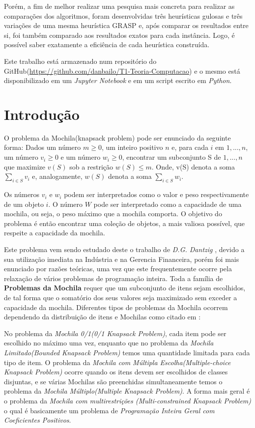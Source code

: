 \documentclass[a4paper, 12pt]{article}
\begin{document}
Porém, a fim de melhor realizar uma pesquisa mais concreta para realizar as comparações dos algoritmos,
foram desenvolvidas três heurísticas gulosas e três variações de uma mesma heurística GRASP e, após comparar
os resultados entre si, foi também comparado aos resultados exatos para cada instância. Logo, é possível saber
exatamente a eficiência de cada heurística construída.

Este trabalho está armazenado num repositório do GitHub(\url{https://github.com/danbailo/T1-Teoria-Computacao}) e
o mesmo está disponibilizado em um \textit{Jupyter Notebook} e em um script escrito em \textit{Python}.
\clearpage

\section{Introdução}

O problema da Mochila(knapsack problem) pode ser enunciado da seguinte forma:
Dados um número $m \geq 0$, um inteiro positivo $n$ e, para cada $i$ em ${1, . . . , n}$, um
número $v_i \geq 0$ e um número $w_i \geq 0$, encontrar um subconjunto S de ${1, . . . , n}$ que
maximize $v(S)$ sob a restrição $w(S)\leq m$. Onde, v(S) denota a soma $\sum_{ i \in S} v_i$ e, 
analogamente, $w(S)$ denota a soma $\sum_{ i \in S} w_i$.

Os números $v_i$ e $w_i$ podem ser interpretados como o valor e peso respectivamente
de um objeto $i$. O número $W$ pode ser interpretado como a capacidade de uma
mochila, ou seja, o peso máximo que a mochila comporta. O objetivo do problema
é então encontrar uma coleção de objetos, a mais valiosa possível, que respeite a
capacidade da mochila.

Este problema vem sendo estudado deste o trabalho de \textit{D.G. Dantzig} \cite{pisinger1995algorithms}, devido a
sua utilização imediata na Indústria e na Gerencia Financeira, porém foi mais enunciado por razões teóricas, 
uma vez que este frequentemente ocorre pela relaxação de vários problemas de programação inteira. 
Toda a família de \textbf{Problemas da Mochila} requer que um subconjunto de itens sejam escolhidos, de tal forma que o
somatório dos seus valores seja maximizado sem exceder a capacidade da mochila.
Diferentes tipos de problemas da Mochila ocorrem dependendo da distribuição de
itens e Mochilas como citado em \cite{pisinger1995algorithms}:

No problema da \textit{Mochila 0/1(0/1 Knapsack Problem)}, cada item pode ser escolhido no máximo uma vez, 
enquanto que no problema da \textit{Mochila Limitado(Bounded Knapsack Problem)} temos uma quantidade limitada 
para cada tipo de item. O problema da \textit{Mochila com Múltipla Escolha(Multiple-choice Knapsack Problem)}
ocorre quando os itens devem ser escolhidos de classes disjuntas, e se várias Mochilas são preenchidas 
simultaneamente temos o problema da \textit{Mochila Múltiplo(Multiple Knapsack Problem)}. 
A forma mais geral é o problema da \textit{Mochila com multirestrições (Multi-constrained Knapsack Problem)} 
o qual é basicamente um problema de \textit{Programação Inteira Geral com Coeficientes Positivos}.
\end{document}
